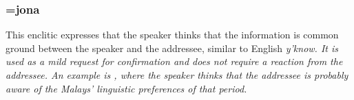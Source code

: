 





% 
% 
% 
% 
% 
%    

  


\subsubsection{=jona}\label{sec:morph:=jona}
This enclitic expresses that the speaker thinks that the information is common ground between the speaker and the addressee, similar to English \em y'know\em. It is used as a mild request for confirmation and does not require a reaction from the addressee. An example is , where the speaker thinks that the addressee is probably aware of the Malays' linguistic preferences of that period.


